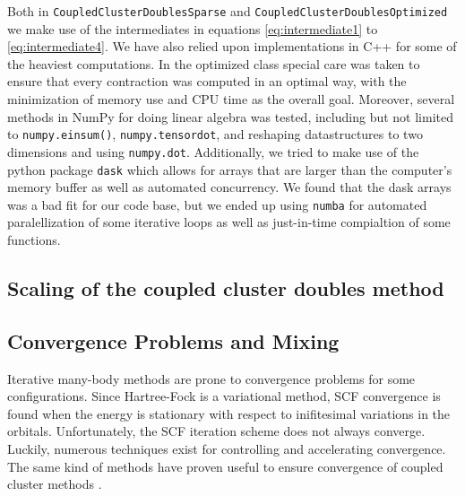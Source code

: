 \documentclass[
    a4paper, aps, twocolumn, floatfix, superscriptaddress,
    nofootinbib]{revtex4-1}
\newcommand{\1}{\mathds{1}}
\begin{document}
        Both in \texttt{CoupledClusterDoublesSparse} and
        \texttt{CoupledClusterDoublesOptimized} we make use
        of the intermediates in equations \ref{eq:intermediate1} to
        \ref{eq:intermediate4}. We have also relied upon implementations
        in C++ for some of the heaviest computations. In the optimized
        class special care was taken to ensure that every contraction
        was computed in an optimal way, with the minimization of memory
        use and CPU time as the overall goal. Moreover, several methods
        in NumPy for doing linear algebra was tested, including but not limited
        to \texttt{numpy.einsum()}, \texttt{numpy.tensordot},
        and reshaping datastructures to two dimensions and using
        \texttt{numpy.dot}. Additionally, we tried to make use of
        the python package \texttt{dask} which allows for arrays that
        are larger than the computer's memory buffer as well as automated
        concurrency. We found that the dask arrays was a bad fit for our code
        base, but we ended up using \texttt{numba} for automated
        paralellization of some iterative loops as well as just-in-time
        compialtion of some functions.

    \subsection{Scaling of the coupled cluster doubles method}
        \label{subsec:ccd_scaling}

    \subsection{Convergence Problems and Mixing}

        Iterative many-body methods are prone to convergence problems for some
        configurations. Since Hartree-Fock is a variational method, SCF convergence
        is found when the energy is stationary with respect to inifitesimal
        variations in the orbitals. Unfortunately, the SCF iteration scheme does
        not always converge. Luckily, numerous techniques exist for controlling
        and accelerating convergence\cite{schlegel1991you}. The same kind of
        methods have proven useful to ensure convergence of coupled cluster methods
        \cite{scuseria1986accelerating}.
\end{document}
